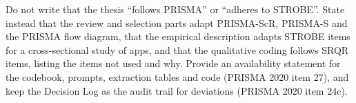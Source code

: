 \begin{thesisbox}
Do not write that the thesis ``follows PRISMA'' or ``adheres to STROBE''. State instead that the review and selection parts adapt PRISMA-ScR, PRISMA-S and the PRISMA flow diagram, that the empirical description adapts STROBE items for a cross-sectional study of apps, and that the qualitative coding follows SRQR items, listing the items not used and why. Provide an availability statement for the codebook, prompts, extraction tables and code (PRISMA 2020 item 27), and keep the Decision Log as the audit trail for deviations (PRISMA 2020 item 24c).
\end{thesisbox}
